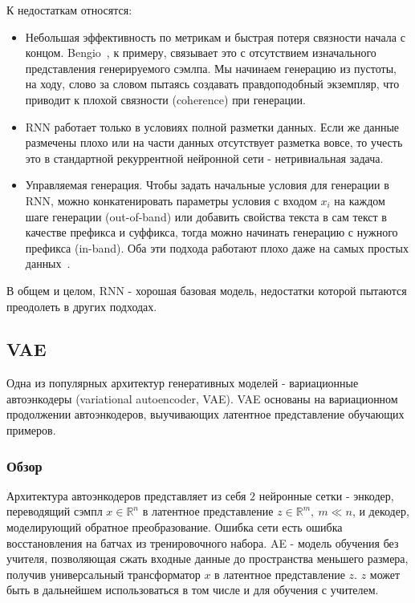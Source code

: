 \documentclass{spbau-diploma}
\begin{document}
К недостаткам относятся:
\begin{itemize}
    \item Небольшая эффективность по метрикам и быстрая потеря связности 
    начала с концом. Bengio~\cite{bengio_rnn}, к примеру, связывает это с 
    отсутствием изначального представления генерируемого сэмлпа. Мы 
    начинаем генерацию из пустоты, на ходу, слово за словом пытаясь создавать
    правдоподобный экземпляр, что приводит к плохой связности (coherence) при
    генерации.
    \item RNN работает только в условиях полной разметки данных. Если же данные
    размечены плохо или на части данных отсутствует разметка вовсе, то учесть
    это в стандартной рекуррентной нейронной сети - нетривиальная задача.
    \item Управляемая генерация. Чтобы задать начальные условия для генерации в 
    RNN, можно конкатенировать параметры условия с входом 
    $x_i$ на каждом шаге генерации (out-of-band) или добавить свойства текста
    в сам текст в качестве префикса и суффикса, тогда можно начинать генерацию
    с нужного префикса (in-band). Оба эти подхода работают плохо даже на самых
    простых данных~\cite{rnn_meta}.
\end{itemize}

В общем и целом, RNN - хорошая базовая модель, недостатки которой пытаются 
преодолеть в других подходах.

\subsection{VAE}
Одна из популярных архитектур генеративных моделей - вариационные автоэнкодеры
(variational autoencoder, VAE). VAE основаны на вариационном продолжении 
автоэнкодеров, выучивающих латентное представление обучающих примеров.

\subsubsection{Обзор}
Архитектура автоэнкодеров представляет из себя $2$ нейронные сетки - энкодер, 
переводящий сэмпл $x \in \mathbb{R}^n$ в латентное представление $z \in \mathbb{R}^m,~m \ll n$, и декодер, моделирующий обратное преобразование. 
Ошибка сети есть ошибка восстановления на батчах из тренировочного набора. AE -
модель обучения без учителя, позволяющая сжать входные данные до пространства
меньшего размера, получив универсальный трансформатор $x$ в латентное 
представление $z$. $z$ может быть в дальнейшем использоваться в том числе и для
обучения с учителем.
\end{document}
